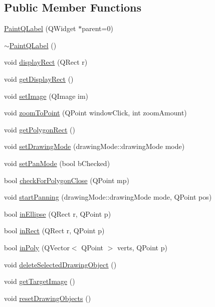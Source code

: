 \subsection*{Public Member Functions}
\begin{DoxyCompactItemize}
\item 
\hyperlink{class_paint_q_label_a079e85cd5d1ec31f20f3c0bb8b510ec2}{Paint\+Q\+Label} (Q\+Widget $\ast$parent=0)
\item 
\hyperlink{class_paint_q_label_a837d8485a5da3e3fc87a30a4ada47cf2}{$\sim$\+Paint\+Q\+Label} ()
\item 
void \hyperlink{class_paint_q_label_abe77c4ddb9e176c54374718d1e782af0}{display\+Rect} (Q\+Rect r)
\item 
void \hyperlink{class_paint_q_label_a58a4d1f0765a00967529fcbb9cecbc91}{get\+Display\+Rect} ()
\item 
void \hyperlink{class_paint_q_label_a18ac8d49bd128e0ce565b588a6e8b66a}{set\+Image} (Q\+Image im)
\item 
void \hyperlink{class_paint_q_label_a30afcb97e84548909b882e0514111e03}{zoom\+To\+Point} (Q\+Point window\+Click, int zoom\+Amount)
\item 
void \hyperlink{class_paint_q_label_a332bf0f6137c8613fbdeac4bd0c1516e}{get\+Polygon\+Rect} ()
\item 
void \hyperlink{class_paint_q_label_a15478ad03c1c6254c3474ab8deb0428f}{set\+Drawing\+Mode} (drawing\+Mode\+::drawing\+Mode mode)
\item 
void \hyperlink{class_paint_q_label_a9f76a4b2851a0906aee6738c91c76969}{set\+Pan\+Mode} (bool b\+Checked)
\item 
bool \hyperlink{class_paint_q_label_aa8b3fe000a0123047ef6b2c884db979a}{check\+For\+Polygon\+Close} (Q\+Point mp)
\item 
void \hyperlink{class_paint_q_label_a76f7bb92d5971c324ff0998babd5a70f}{start\+Panning} (drawing\+Mode\+::drawing\+Mode mode, Q\+Point pos)
\item 
bool \hyperlink{class_paint_q_label_a2ba7f833ed473795ad0e9f1ccb0f29b3}{in\+Ellipse} (Q\+Rect r, Q\+Point p)
\item 
bool \hyperlink{class_paint_q_label_aa01fed3a13d42241b4769d14290a85e6}{in\+Rect} (Q\+Rect r, Q\+Point p)
\item 
bool \hyperlink{class_paint_q_label_af6562b147730457b828f0c776ff001e6}{in\+Poly} (Q\+Vector$<$ Q\+Point $>$ verts, Q\+Point p)
\item 
void \hyperlink{class_paint_q_label_a56784c6095f3ff7938ccc1c76feb7ad6}{delete\+Selected\+Drawing\+Object} ()
\item 
void \hyperlink{class_paint_q_label_a409e0869a3115968f025878ad49d9883}{get\+Target\+Image} ()
\item 
void \hyperlink{class_paint_q_label_aeac060e87e6671f65fb3a5ff4e3f15f4}{reset\+Drawing\+Objects} ()
\end{DoxyCompactItemize}
